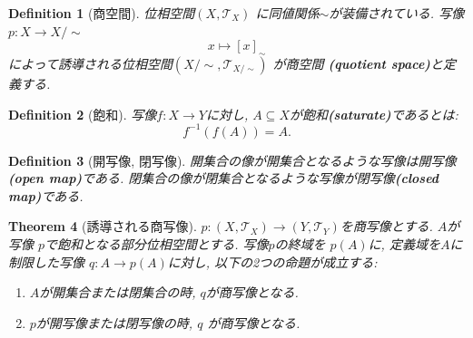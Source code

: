 \documentclass[dvipdfmx]{jbook}
\newtheorem{theorem}{Theorem}[section]
\newtheorem{definition}[theorem]{Definition}
\theoremstyle{remark}
\theoremstyle{plain}
\begin{document}
\begin{definition}[商空間]
	位相空間$\left( X, \mathcal{T}_X \right) $ に同値関係$\sim$が装備されている. 
	 写像$p: X \to X / \sim $
      $$
	x \mapsto [x]_{\sim}
      $$
      によって誘導される位相空間$\left( X / \sim , \mathcal{T}_{X / \sim} \right) $ が商空間 \textbf{(quotient space)}と定義する.
\end{definition}

\begin{definition}[飽和]
	写像$f:X \to Y$に対し, $A \subseteq X$が飽和\textbf{(saturate)}であるとは:
	\[
	f^{-1}\left(f( A) \right) = A
	.\] 
\end{definition}

\begin{definition}[開写像, 閉写像]
開集合の像が開集合となるような写像は開写像\textbf{(open map)}である. 閉集合の像が閉集合となるような写像が閉写像\textbf{(closed map)}である.	
\end{definition}

\begin{theorem}[誘導される商写像]
	$p: (X,\mathcal{T}_X) \to \left( Y,\mathcal{T}_Y \right) $を商写像とする. $A$が写像 $p$で飽和となる部分位相空間とする.  写像$p$の終域を $p(A)$に, 定義域を$A$に制限した写像 $q: A \to p(A)$に対し, 以下の2つの命題が成立する:
	\begin{enumerate}
		\item $A$が開集合または閉集合の時,  $q$が商写像となる.
		\item  $p$が開写像または閉写像の時,  $q$ が商写像となる.
	\end{enumerate}
\end{theorem}
\end{document}
